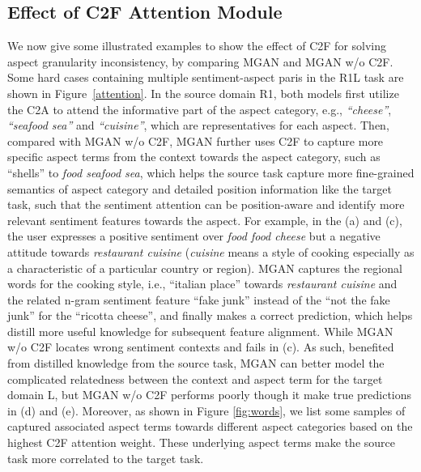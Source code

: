 \documentclass[letterpaper]{article} \usepackage{aaai19}  \usepackage{times}  \usepackage{latexsym}
\begin{document}
\subsection{Effect of C2F Attention Module}
\vspace{-0.5mm}
We now give some illustrated examples to show the effect of C2F for solving aspect granularity inconsistency, by comparing MGAN and MGAN w/o C2F. Some hard cases containing multiple sentiment-aspect paris in the R1L task are shown in Figure~\ref{attention}. In the source domain R1, both models first utilize the C2A to attend the informative part of the aspect category, e.g., {\it ``cheese''},  {\it ``seafood sea''} and {\it ``cuisine''}, which are representatives for each aspect. Then, compared with MGAN w/o C2F, MGAN further uses C2F to capture more specific aspect terms from the context towards the aspect category, such as {``shells''} to {\it food seafood sea}, which helps the source task capture more fine-grained semantics of aspect category and detailed position information like the target task, such that the sentiment attention can be position-aware and identify more relevant sentiment features towards the aspect. For example, in the (a) and (c), the user expresses a positive sentiment over {\it food food cheese} but a negative attitude towards {\it restaurant cuisine} ({\it cuisine} means a style of cooking especially as a characteristic of a particular country or region). MGAN captures the regional words for the cooking style, i.e., {``italian place''} towards {\it restaurant cuisine} and the related n-gram sentiment feature {``fake junk''} instead of the {``not the fake junk''} for the {``ricotta cheese''}, and finally makes a correct prediction, which helps distill more useful knowledge for subsequent feature alignment. While MGAN w/o C2F locates wrong sentiment contexts and fails in (c). As such, benefited from distilled knowledge from the source task, MGAN can better model the complicated relatedness between the context and aspect term for the target domain L, but MGAN w/o C2F performs poorly though it make true predictions in (d) and (e). Moreover, as shown in Figure \ref{fig:words}, we list some samples of captured associated aspect terms towards different aspect categories based on the highest C2F attention weight. These underlying aspect terms make the source task more correlated to the target task.

\vspace{-2mm}
\end{document}
